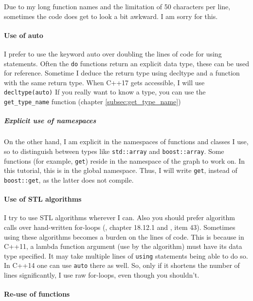 Due to my long function names and the limitation of 50 characters per line,
sometimes the code does get to look a bit awkward.
I am sorry for this.

\paragraph{Use of auto}

I prefer to use the keyword auto over doubling the lines of code for using
statements.
Often the \verb;do; functions return an explicit data type, these can be used
for reference.
Sometime I deduce the return type using decltype and a function with the
same return type.
When C++17  gets accessible, 
I will use \verb;decltype(auto); 
If you really want to know a type, you can use the \verb;get_type_name; function
(chapter \ref{subsec:get_type_name})

\subparagraph{Explicit use of namespaces}

On the other hand, I am explicit in the namespaces of functions and classes
I use, so to distinguish between types like \verb;std::array; and \verb;boost::array;.
Some functions (for example, \verb;get;) reside 
in the namespace of the graph to work on.
In this tutorial, this is in the global namespace.
Thus, I will write \verb;get;, instead of \verb;boost::get;, 
as the latter does not compile.

\paragraph{Use of STL algorithms}

I try to use STL algorithms wherever I can.
Also you should prefer algorithm calls over hand-written 
for-loops (\cite{stroustrup1997}, chapter 18.12.1 and \cite{meyers2005effective}, item 43).
Sometimes using these algorithms becomes a burden on the lines of code.
This is because in C++11, a lambda function argument (use by the algorithm)
must have its data type specified.
It may take multiple lines of \verb;using; statements being able to do so.
In C++14 one can use \verb;auto; there as well.
So, only if it shortens the number of lines significantly, I use raw for-loops,
even though you shouldn't.

\paragraph{Re-use of functions}

